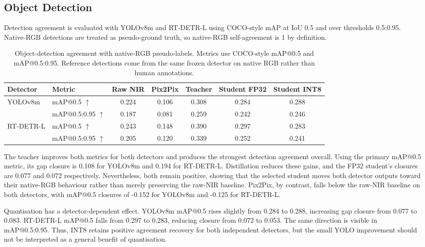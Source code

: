 \subsection{Object Detection}

Detection agreement is evaluated with YOLOv8m and RT-DETR-L using COCO-style mAP at IoU 0.5 and over thresholds 0.5:0.95. Native-RGB detections are treated as pseudo-ground truth, so native-RGB self-agreement is 1 by definition.

\begin{table}[!htbp]
\centering
\footnotesize
\begin{tabular}{llccccc}
\hline
\textbf{Detector} & \textbf{Metric} & \textbf{Raw NIR} & \textbf{Pix2Pix} & \textbf{Teacher} & \textbf{Student FP32} & \textbf{Student INT8} \\
\hline
YOLOv8m & mAP@0.5 $\uparrow$ & 0.224 & 0.106 & 0.308 & 0.284 & 0.288 \\
        & mAP@0.5:0.95 $\uparrow$ & 0.187 & 0.081 & 0.259 & 0.242 & 0.246 \\
RT-DETR-L & mAP@0.5 $\uparrow$ & 0.243 & 0.148 & 0.390 & 0.297 & 0.283 \\
          & mAP@0.5:0.95 $\uparrow$ & 0.205 & 0.120 & 0.339 & 0.252 & 0.241 \\
\hline
\end{tabular}
\caption{Object-detection agreement with native-RGB pseudo-labels. Metrics use COCO-style mAP@0.5 and mAP@0.5:0.95. Reference detections come from the same frozen detector on native RGB rather than human annotations.}
\label{tab:res_detection}
\end{table}

The teacher improves both metrics for both detectors and produces the strongest detection agreement overall. Using the primary mAP@0.5 metric, its gap closure is 0.108 for YOLOv8m and 0.194 for RT-DETR-L. Distillation reduces these gains, and the FP32 student's closures are 0.077 and 0.072 respectively. Nevertheless, both remain positive, showing that the selected student moves both detector outputs toward their native-RGB behaviour rather than merely preserving the raw-NIR baseline. Pix2Pix, by contrast, falls below the raw-NIR baseline on both detectors, with mAP@0.5 closures of -0.152 for YOLOv8m and -0.125 for RT-DETR-L.

Quantisation has a detector-dependent effect. YOLOv8m mAP@0.5 rises slightly from 0.284 to 0.288, increasing gap closure from 0.077 to 0.083. RT-DETR-L mAP@0.5 falls from 0.297 to 0.283, reducing closure from 0.072 to 0.053. The same direction is visible in mAP@0.5:0.95. Thus, INT8 retains positive agreement recovery for both independent detectors, but the small YOLO improvement should not be interpreted as a general benefit of quantisation.

